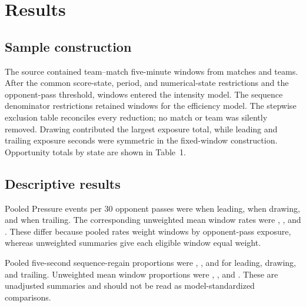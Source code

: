 \section{Results}

\subsection{Sample construction}
The source contained \InitialWindows{} team--match five-minute windows from \MatchCount{} matches and \TeamCount{} teams. After the common score-state, period, and numerical-state restrictions and the opponent-pass threshold, \IntensityWindows{} windows entered the intensity model. The sequence denominator restrictions retained \EfficiencyWindows{} windows for the efficiency model. The stepwise exclusion table reconciles every reduction; no match or team was silently removed. Drawing contributed the largest exposure total, while leading and trailing exposure seconds were symmetric in the fixed-window construction. Opportunity totals by state are shown in Table~1.

\subsection{Descriptive results}
Pooled Pressure events per 30 opponent passes were \DescriptiveIntensityLeadingPooled{} when leading, \DescriptiveIntensityDrawingPooled{} when drawing, and \DescriptiveIntensityTrailingPooled{} when trailing. The corresponding unweighted mean window rates were \DescriptiveIntensityLeadingMean{}, \DescriptiveIntensityDrawingMean{}, and \DescriptiveIntensityTrailingMean{}. These differ because pooled rates weight windows by opponent-pass exposure, whereas unweighted summaries give each eligible window equal weight.

Pooled five-second sequence-regain proportions were \DescriptiveEfficiencyLeadingPooled{}, \DescriptiveEfficiencyDrawingPooled{}, and \DescriptiveEfficiencyTrailingPooled{} for leading, drawing, and trailing. Unweighted mean window proportions were \DescriptiveEfficiencyLeadingMean{}, \DescriptiveEfficiencyDrawingMean{}, and \DescriptiveEfficiencyTrailingMean{}. These are unadjusted summaries and should not be read as model-standardized comparisons.

